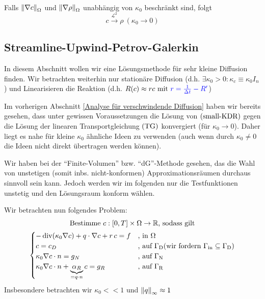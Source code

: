 \begin{Korollar}~
	
	Falls $ \norm{\nabla c}_\Omega $ und $ \norm{\nabla \rho}_\Omega $ unabhängig von $ \kappa_0 $ beschränkt sind, folgt
	\[ c \stackrel{\mathcal{L}^2}{\to} \rho \ (\kappa_0 \to 0) \]
\end{Korollar}

\subsection{Streamline-Upwind-Petrov-Galerkin}
In diesem Abschnitt wollen wir eine Lösungsmethode für sehr kleine Diffusion finden. Wir betrachten weiterhin nur stationäre Diffusion (d.h. $ \exists \kappa_0 > 0: \kappa_c \equiv \kappa_0 I_n $) und Linearisieren die Reaktion (d.h. $ R(c) \approx r c \text{ mit } \textcolor{blue}{r =  \frac{1}{\Delta t} - R'}$)

Im vorherigen Abschnitt \ref{Analyse für verschwindende Diffusion} haben wir bereits gesehen, dass unter gewissen Voraussetzungen die Lösung von $ \operatorname{(small-KDR)} $ gegen die Lösung der linearen Transportgleichung $ \operatorname{(TG)} $ konvergiert (für $ \kappa_0 \to 0 $). Daher liegt es nahe für kleine $ \kappa_0  $ ähnliche Ideen zu verwenden (auch wenn durch $ \kappa_0 \neq 0 $ die Ideen nicht direkt übertragen werden können).

Wir haben bei der \enquote{Finite-Volumen} bzw. \enquote{dG}-Methode gesehen, das die Wahl von unstetigen (somit inbs. nicht-konformen) Approximationsräumen durchaus sinnvoll sein kann. Jedoch werden wir im folgenden nur die Testfunktionen unstetig und den Lösungsraum konform wählen.

Wir betrachten nun folgendes Problem:
\begin{gather*}
	\text{Bestimme } c:[0,T] \times \Omega \to \mathbb{R} \text{, sodass gilt}\\
	\begin{cases}
		- \operatorname{div}(\kappa_0 \nabla c) + q \cdot \nabla c + r \, c = f &\text{, in } \Omega\\
		c = c_D &\text{, auf } \Gamma_{\text{D}} (\text{wir fordern } \Gamma_{{\text{in}}} \subseteq \Gamma_{\text{D}})\\
		\kappa_0 \nabla c \cdot n = g_N &\text{, auf } \Gamma_{\text{N}}\\
		\kappa_0 \nabla c \cdot n  + \underbrace{\alpha_R}_{= q \cdot n} c = g_R &\text{, auf } \Gamma_{\text{R}}
	\end{cases}
\end{gather*}
Insbesondere betrachten wir $ \kappa_0 << 1 $ und $ \norm{q}_\infty \approx 1 $

